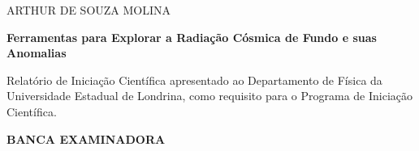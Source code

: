 \documentclass[12pt,a4paper,oneside,brazil]{abntex2}
\theoremstyle{definition}
\numberwithin{defin}{section}
\numberwithin{thm}{section}
\numberwithin{notation}{section}
\theoremstyle{remark}
\numberwithin{exmp}{section}
\numberwithin{p}{section}
\numberwithin{lema}{section}
\begin{document}
	\begin{folhadeaprovacao}
		\thispagestyle{empty}
		\begin{center}
			{\large{}ARTHUR DE SOUZA MOLINA}
			\par\end{center}{\large \par}
		
		\begin{center}
			\vfill{}
			\par\end{center}
		
		\begin{DoubleSpace}
			\begin{center}
				\textbf{\large{}Ferramentas para Explorar a Radiação Cósmica de Fundo e suas Anomalias}
				\par\end{center}{\large \par}
		\end{DoubleSpace}
		
		\begin{center}
			\vfill{}
			
			\par\end{center}
		
		\noindent \begin{flushright}
			\begin{minipage}[c]{9.5cm}%
				Relatório de Iniciação Científica apresentado ao Departamento de Física da Universidade Estadual de Londrina, como requisito para o Programa de Iniciação Científica.
				\begin{center}
					\vspace{1cm}
					\textbf{BANCA EXAMINADORA}
					\par\end{center}
				\vspace{1cm}
				

\end{minipage}
\end{flushright}
\end{folhadeaprovacao}
\end{document}
